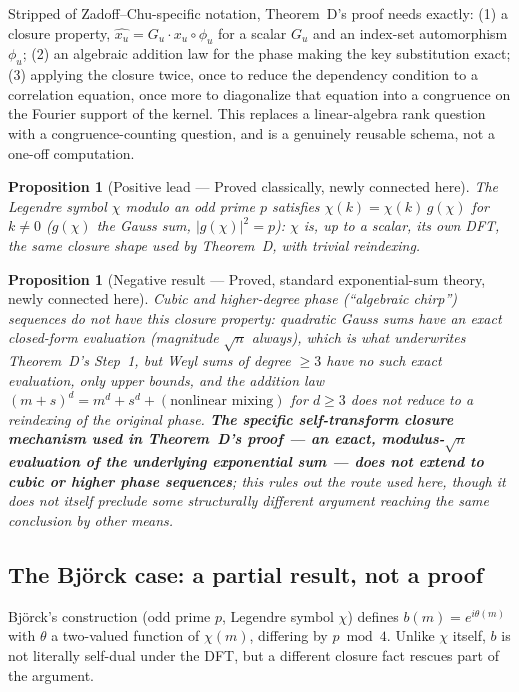\documentclass[11pt]{article}
\theoremstyle{plain}
\newtheorem{proposition}[theorem]{Proposition}
\theoremstyle{definition}
\theoremstyle{remark}
\begin{document}
Stripped of Zadoff--Chu-specific notation, Theorem~D's proof needs exactly:
(1) a closure property, $\widehat{x_u}=G_u\cdot x_u\circ\phi_u$ for a
scalar $G_u$ and an index-set automorphism $\phi_u$; (2) an algebraic
addition law for the phase making the key substitution exact; (3) applying
the closure twice, once to reduce the dependency condition to a
correlation equation, once more to diagonalize that equation into a
congruence on the Fourier support of the kernel. This replaces a
linear-algebra rank question with a congruence-counting question, and is a
genuinely reusable schema, not a one-off computation.

\begin{proposition}[Positive lead --- Proved classically, newly connected here]
The Legendre symbol $\chi$ modulo an odd prime $p$ satisfies
$\hat\chi(k)=\chi(k)\,g(\chi)$ for $k\ne0$ ($g(\chi)$ the Gauss sum,
$|g(\chi)|^2=p$): $\chi$ is, up to a scalar, its own DFT, the same closure
shape used by Theorem~D, with trivial reindexing.
\end{proposition}

\begin{proposition}[Negative result --- Proved, standard exponential-sum
theory, newly connected here]
Cubic and higher-degree phase (``algebraic chirp'') sequences do not have
this closure property: quadratic Gauss sums have an exact closed-form
evaluation (magnitude $\sqrt n$ always), which is what underwrites
Theorem~D's Step~1, but Weyl sums of degree $\ge3$ have no such exact
evaluation, only upper bounds, and the addition law
$(m+s)^d=m^d+s^d+(\text{nonlinear mixing})$ for $d\ge3$ does not reduce to
a reindexing of the original phase. \textbf{The specific self-transform
closure mechanism used in Theorem~D's proof --- an exact, modulus-$\sqrt n$
evaluation of the underlying exponential sum --- does not extend to cubic
or higher phase sequences}; this rules out the route used here, though it
does not itself preclude some structurally different argument reaching
the same conclusion by other means.
\end{proposition}

\subsection{The Bj\"orck case: a partial result, not a proof}

Björck's construction (odd prime $p$, Legendre symbol $\chi$)
\cite{Bjorck90} defines $b(m)=e^{i\theta(m)}$ with $\theta$ a two-valued
function of $\chi(m)$, differing by $p\bmod4$. Unlike $\chi$ itself, $b$
is not literally self-dual under the DFT, but a different closure fact
rescues part of the argument.
\end{document}
